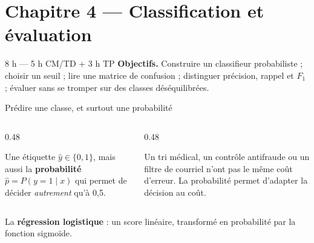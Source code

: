 \section{Chapitre 4 --- Classification et évaluation}

%
{8 h --- 5 h CM/TD + 3 h TP}%
{\textbf{Objectifs.} Construire un classifieur probabiliste ; choisir un seuil ;
lire une matrice de confusion ; distinguer précision, rappel et $F_1$ ; évaluer
sans se tromper sur des classes déséquilibrées.}

\begin{frame}{Prédire une classe, et surtout une probabilité}
\begin{columns}[t]
\begin{column}{0.48\textwidth}
\begin{ebox}[La sortie]
Une étiquette $\hat y\in\{0,1\}$, mais aussi la \textbf{probabilité}
$\hat p=P(y=1\mid x)$ qui permet de décider \emph{autrement} qu'à 0,5.
\end{ebox}
\end{column}
\begin{column}{0.48\textwidth}
\begin{kbox}
Un tri médical, un contrôle antifraude ou un filtre de courriel n'ont pas le
même coût d'erreur. La probabilité permet d'adapter la décision au coût.
\end{kbox}
\end{column}
\end{columns}
\vspace{2mm}
\begin{solbox}
La \textbf{régression logistique} : un score linéaire, transformé en probabilité
par la fonction sigmoïde.
\end{solbox}
\end{frame}

